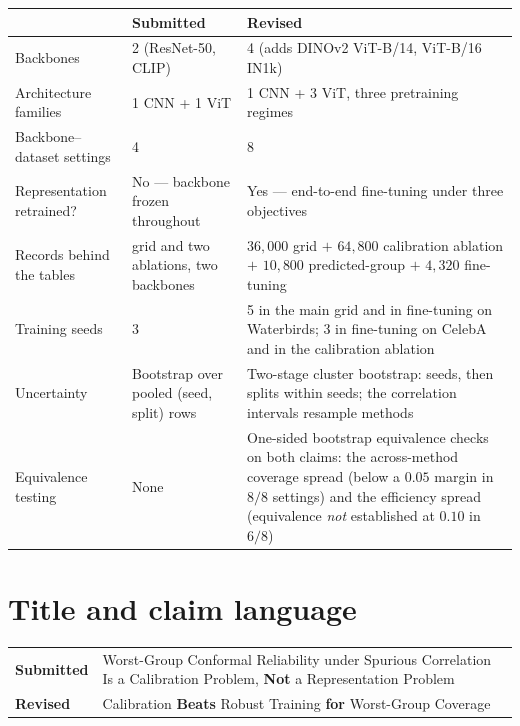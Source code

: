 \documentclass[11pt,a4paper]{article}
\newcommand{\was}[1]{\textcolor{cutred}{#1}}
\newcommand{\now}[1]{\textcolor{addblue}{#1}}
\begin{document}
\begin{center}
\begin{tabular}{@{}L{4.6cm}L{4.9cm}L{4.9cm}@{}}
\toprule
& \textbf{Submitted} & \textbf{Revised} \\
\midrule
Backbones & \was{2} (ResNet-50, CLIP) & \now{4} (adds DINOv2 ViT-B/14, ViT-B/16 IN1k) \\
\addlinespace
Architecture families & \was{1 CNN + 1 ViT} & \now{1 CNN + 3 ViT, three pretraining regimes} \\
\addlinespace
Backbone--dataset settings & \was{4} & \now{8} \\
\addlinespace
Representation retrained? & \was{No --- backbone frozen throughout} &
\now{Yes --- end-to-end fine-tuning under three objectives} \\
\addlinespace
Records behind the tables & \was{grid and two ablations, two backbones} &
\now{$36{,}000$ grid $+$ $64{,}800$ calibration ablation $+$ $10{,}800$ predicted-group $+$
$4{,}320$ fine-tuning} \\
\addlinespace
Training seeds & \was{3} &
\now{5 in the main grid and in fine-tuning on Waterbirds; 3 in fine-tuning on CelebA and in the
calibration ablation} \\
\addlinespace
Uncertainty & \was{Bootstrap over pooled (seed, split) rows} &
\now{Two-stage cluster bootstrap: seeds, then splits within seeds; the correlation intervals
resample methods} \\
\addlinespace
Equivalence testing & \was{None} & \now{One-sided bootstrap equivalence checks on both claims: the
across-method coverage spread (below a $0.05$ margin in $8/8$ settings) and the efficiency spread
(equivalence \emph{not} established at $0.10$ in $6/8$)} \\
\bottomrule
\end{tabular}
\end{center}

\section{Title and claim language}

\begin{center}
\begin{tabular}{@{}L{1.9cm}L{12.6cm}@{}}
\toprule
\textbf{Submitted} & \was{Worst-Group Conformal Reliability under Spurious Correlation Is a
Calibration Problem, \textbf{Not} a Representation Problem} \\
\addlinespace
\textbf{Revised} & \now{Calibration \textbf{Beats} Robust Training \textbf{for}
Worst-Group Coverage} \\
\bottomrule
\end{tabular}
\end{center}
\end{document}
